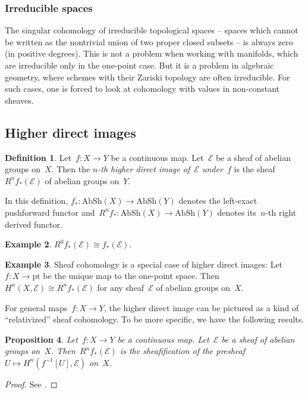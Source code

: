 \documentclass[10pt]{amsart}
\theoremstyle{definition}
\newtheorem{defn}{Definition}[section]
\newtheorem{ex}[defn]{Example}
\theoremstyle{plain}
\newtheorem{prop}[defn]{Proposition}
\theoremstyle{remark}
\newcommand{\E}{\mathcal{E}}
\newcommand{\AbSh}{\mathrm{AbSh}}
\newcommand{\pt}{\mathrm{pt}}
\newcommand{\stackhref}[1]{\href{http://stacks.math.columbia.edu/tag/#1}{#1}}
\begin{document}
\subsubsection*{Irreducible spaces} The singular cohomology of irreducible topological
spaces -- spaces which cannot be written as the nontrivial union of two proper
closed subsets -- is always zero (in positive degrees). This is not a problem
when working with manifolds, which are irreducible only in the one-point case.
But it is a problem in algebraic geometry, where schemes with their Zariski
topology are often irreducible. For such cases, one is forced to look at
cohomology with values in non-constant sheaves.


\subsection{Higher direct images}

\begin{defn}Let~$f : X \to Y$ be a continuous map. Let~$\E$ be a sheaf of
abelian groups on~$X$. Then the \emph{$n$-th higher direct image of~$\E$
under~$f$} is the sheaf~$R^n f_*(\E)$ of abelian groups on~$Y$.\end{defn}

In this definition, $f_* : \AbSh(X) \to \AbSh(Y)$ denotes the left-exact
pushforward functor and~$R^n f_* : \AbSh(X) \to \AbSh(Y)$ denotes its~$n$-th right
derived functor.

\begin{ex}$R^0 f_*(\E) \cong f_*(\E)$.\end{ex}

\begin{ex}Sheaf cohomology is a special case of higher direct images: Let~$f : X
\to \pt$ be the unique map to the one-point space. Then~$H^n(X,\E) \cong R^n
f_*(\E)$ for any sheaf~$\E$ of abelian groups on~$X$.\end{ex}

For general maps~$f : X \to Y$, the higher direct image can be pictured as a
kind of ``relativized'' sheaf cohomology. To be more specific, we have the
following results.

\begin{prop}Let~$f : X \to Y$ be a continuous map. Let~$\E$ be a sheaf of
abelian groups on~$X$. Then~$R^n f_*(\E)$ is the sheafification of the
presheaf~$U \mapsto H^n(f^{-1}[U], \E)$ on~$X$.\end{prop}

\begin{proof}See \cite[Tag~\stackhref{01E4}]{stacks-project}.
\end{proof}
\end{document}
